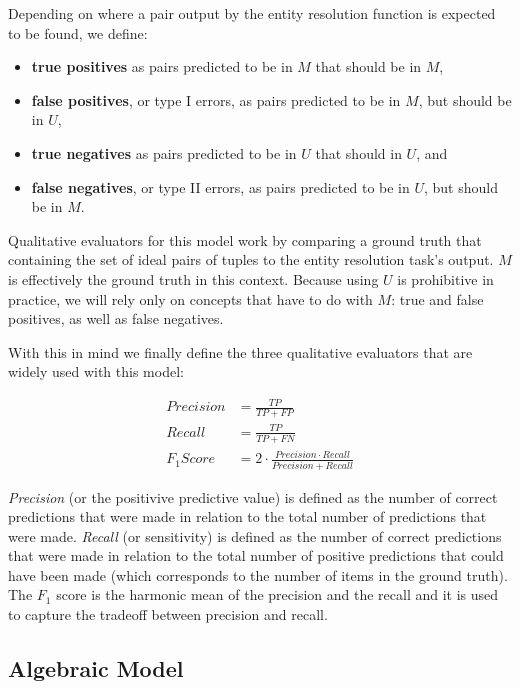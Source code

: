 \documentclass[11pt]{article}
\begin{document}
    Depending on where a pair output by the entity resolution function is
    expected to be found, we define:

    \begin{itemize}
        \item \textbf{true positives} as pairs predicted to be in $M$ that
        should be in $M$,
        \item \textbf{false positives}, or type I errors, as pairs predicted to
        be in $M$, but should be in $U$,
        \item \textbf{true negatives} as pairs predicted to be in $U$ that
        should in $U$, and
        \item \textbf{false negatives}, or type II errors, as pairs predicted to
        be in $U$, but should be in $M$.
    \end{itemize}

    Qualitative evaluators for this model work by comparing a ground truth that
    containing the set of ideal pairs of tuples to the entity resolution task's
    output.
    $M$ is effectively the ground truth in this context.
    Because using $U$ is prohibitive in practice, we will rely only on concepts
    that have to do with $M$: true and false positives, as well as false
    negatives.

    With this in mind we finally define the three qualitative evaluators that
    are widely used with this model:

    \begin{align}
    Precision&=\frac{TP}{TP+FP} \\
    Recall&=\frac{TP}{TP+FN} \\
    F_1 Score&=2 \cdot \frac{Precision \cdot Recall}{Precision+Recall}
    \end{align}

    \textit{Precision} (or the positivive predictive value) is defined as the
    number of correct predictions that were made in relation to the total number
    of predictions that were made.
    \textit{Recall} (or sensitivity) is defined as the number of correct
    predictions that were made in relation to the total number of positive
    predictions that could have been made (which corresponds to the number of
    items in the ground truth).
    The \textit{$F_1$} score is the harmonic mean of the precision and the
    recall and it is used to capture the tradeoff between precision and
    recall\cite{hitesh2012}.

    \subsection[algebraic]{Algebraic Model}\label{subsec:algebraic}
\end{document}
